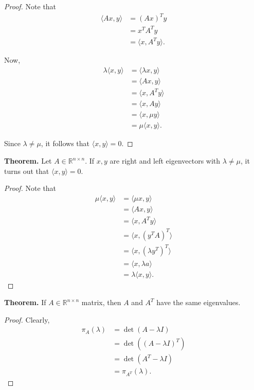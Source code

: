 \documentclass{article}
\newcommand{\RR}{\mathbb{R}}
\newcommand{\la}{\langle}
\newcommand{\ra}{\rangle}
\begin{document}
 \begin{proof}
   Note that
   \begin{align*}
     \la Ax, y \ra &= (Ax)^T y \\
     &= x^T A^T y \\
     &= \la x, A^T y \ra.
   \end{align*}

   Now,
   \begin{align*}
     \lambda \la x, y \ra &= \la \lambda x, y \ra \\
     &= \la Ax, y \ra \\
     &= \la x, A^T y \ra \\
     &= \la x, A y \ra \\
     &= \la x, \mu y \ra \\
     &= \mu \la x, y \ra.
   \end{align*}

   Since $\lambda \neq \mu$, it follows that $\la x, y \ra = 0$.
 \end{proof}

 {\bf Theorem.} Let $A \in \RR^{n \times n}$.  If $x, y$ are right and left eigenvectors with $\lambda \neq \mu$, it turns out that $\la x, y \ra = 0$.

 \begin{proof}
   Note that
   \begin{align*}
     \mu \la x, y \ra &= \la \mu x, y \ra \\
     &= \la Ax, y \ra \\
     &= \la x, A^T y \ra \\
     &= \la x, (y^T A)^T \ra \\
     &= \la x, (\lambda y^T)^T \ra \\
     &= \la x, \lambda a \ra \\
     &= \lambda \la x, y \ra.
   \end{align*}
 \end{proof}

 {\bf Theorem.} If $A \in \RR^{n \times n}$ matrix, then $A$ and $A^T$ have the same eigenvalues.

 \begin{proof}
 Clearly,
 \begin{align*}
   \pi_A(\lambda) &= \det (A - \lambda I) \\
   &= \det ( ( A - \lambda I)^T ) \\
   &= \det (A^T - \lambda I) \\
   &= \pi_{A^T} (\lambda).
 \end{align*}
\end{proof}
\end{document}
